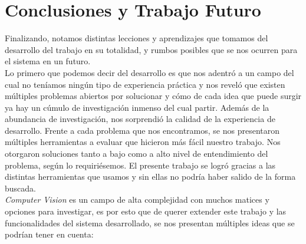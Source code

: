 \documentclass[a4paper]{article}
\begin{document}
\newpage
\section{Conclusiones y Trabajo Futuro}

Finalizando, notamos distintas lecciones y aprendizajes que tomamos del desarrollo del trabajo en su totalidad, y rumbos posibles que se nos ocurren para el sistema en un futuro. \\

Lo primero que podemos decir del desarrollo es que nos adentró a un campo del cual no teníamos ningún tipo de experiencia práctica y nos reveló que existen múltiples problemas abiertos por solucionar y cómo de cada idea que puede surgir ya hay un cúmulo de investigación inmenso del cual partir.
Además de la abundancia de investigación, nos sorprendió la calidad de la experiencia de desarrollo. Frente a cada problema que nos encontramos, se nos presentaron múltiples herramientas a evaluar que hicieron más fácil nuestro trabajo. Nos otorgaron soluciones tanto a bajo como a alto nivel de entendimiento del problema, según lo requiriésemos. El presente trabajo se logró gracias a las distintas herramientas que usamos y sin ellas no podría haber salido de la forma buscada. \\

\textit{Computer Vision} es un campo de alta complejidad con muchos matices y opciones para investigar, es por esto que de querer extender este trabajo y las funcionalidades del sistema desarrollado, se nos presentan múltiples ideas que se podrían tener en cuenta:
\end{document}

